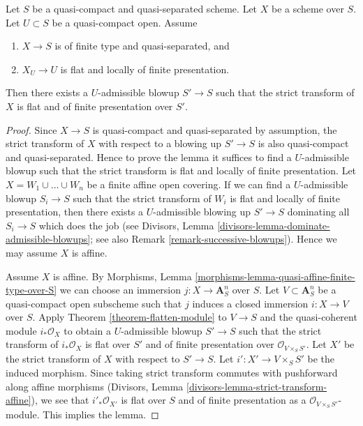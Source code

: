\begin{lemma}
\label{lemma-flat-after-blowing-up}
Let $S$ be a quasi-compact and quasi-separated scheme.
Let $X$ be a scheme over $S$.
Let $U \subset S$ be a quasi-compact open.
Assume
\begin{enumerate}
\item $X \to S$ is of finite type and quasi-separated, and
\item $X_U \to U$ is flat and locally of finite presentation.
\end{enumerate}
Then there exists a $U$-admissible blowup $S' \to S$ such that
the strict transform of $X$ is flat and of finite presentation
over $S'$.
\end{lemma}

\begin{proof}
Since $X \to S$ is quasi-compact and quasi-separated by assumption,
the strict transform of $X$ with respect to a blowing up $S' \to S$
is also quasi-compact and quasi-separated. Hence to prove the lemma
it suffices to find a $U$-admissible blowup such that the strict
transform is flat and locally of finite presentation.
Let $X = W_1 \cup \ldots \cup W_n$ be a finite affine open covering.
If we can find a $U$-admissible blowup $S_i \to S$ such that the
strict transform of $W_i$ is flat and locally of finite presentation,
then there exists a $U$-admissible blowing up $S' \to S$ dominating
all $S_i \to S$ which does the job (see
Divisors, Lemma \ref{divisors-lemma-dominate-admissible-blowups};
see also Remark \ref{remark-successive-blowups}).
Hence we may assume $X$ is affine.

\medskip\noindent
Assume $X$ is affine. By
Morphisms, Lemma \ref{morphisms-lemma-quasi-affine-finite-type-over-S}
we can choose an immersion $j : X \to \mathbf{A}^n_S$ over $S$.
Let $V \subset \mathbf{A}^n_S$ be a quasi-compact open subscheme
such that $j$ induces a closed immersion $i : X \to V$ over $S$. Apply
Theorem \ref{theorem-flatten-module}
to $V \to S$ and the quasi-coherent module $i_*\mathcal{O}_X$
to obtain a $U$-admissible blowup $S' \to S$ such that the strict
transform of $i_*\mathcal{O}_X$ is flat over $S'$ and of finite presentation
over $\mathcal{O}_{V \times_S S'}$. Let $X'$ be the strict transform
of $X$ with respect to $S' \to S$. Let $i' : X' \to V \times_S S'$
be the induced morphism.
Since taking strict transform commutes with pushforward along affine
morphisms (Divisors, Lemma \ref{divisors-lemma-strict-transform-affine}),
we see that $i'_*\mathcal{O}_{X'}$ is flat over $S$ and of
finite presentation as a $\mathcal{O}_{V \times_S S'}$-module.
This implies the lemma.
\end{proof}
